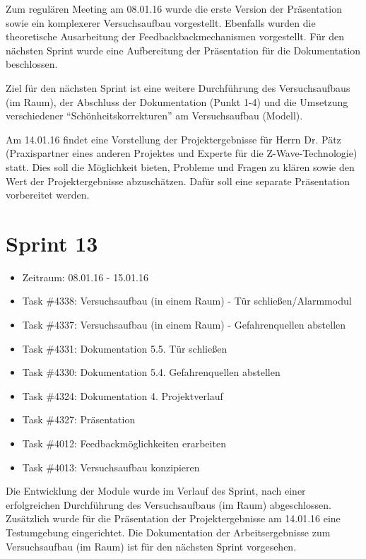 \documentclass[12pt, oneside, smallheadings]{scrbook}
\begin{document}
Zum regulären Meeting am 08.01.16 wurde die erste Version der Präsentation sowie ein komplexerer Versuchsaufbau vorgestellt. Ebenfalls wurden die theoretische Ausarbeitung der Feedbackbackmechanismen vorgestellt. Für den nächsten Sprint wurde eine Aufbereitung der Präsentation für die Dokumentation beschlossen.

Ziel für den nächsten Sprint ist eine weitere Durchführung des Versuchsaufbaus (im Raum), der Abschluss der Dokumentation (Punkt 1-4) und die Umsetzung verschiedener "`Schönheitskorrekturen"' am Versuchsaufbau (Modell). 

Am 14.01.16 findet eine Vorstellung der Projektergebnisse für Herrn Dr. Pätz (Praxispartner eines anderen Projektes und Experte für die Z-Wave-Technologie) statt. Dies soll die Möglichkeit bieten, Probleme und Fragen zu klären sowie den Wert der Projektergebnisse abzuschätzen. Dafür soll eine separate Präsentation vorbereitet werden.

\section{Sprint 13}
\begin{itemize}
	\item Zeitraum: 08.01.16 - 15.01.16 \newline
	\item Task \#4338: Versuchsaufbau (in einem Raum) - Tür schließen/Alarmmodul
	\item Task \#4337: Versuchsaufbau (in einem Raum) - Gefahrenquellen abstellen
	\item Task \#4331: Dokumentation 5.5. Tür schließen
	\item Task \#4330: Dokumentation 5.4. Gefahrenquellen abstellen
	\item Task \#4324: Dokumentation 4. Projektverlauf
	\item Task \#4327: Präsentation
	\item Task \#4012: Feedbackmöglichkeiten erarbeiten
	\item Task \#4013: Versuchsaufbau konzipieren\\
\end{itemize}
\noindent
Die Entwicklung der Module wurde im Verlauf des Sprint, nach einer erfolgreichen Durchführung des Versuchsaufbaus (im Raum) abgeschlossen. Zusätzlich wurde für die Präsentation der Projektergebnisse am 14.01.16 eine Testumgebung eingerichtet. Die Dokumentation der Arbeitsergebnisse zum Versuchsaufbau (im Raum) ist für den nächsten Sprint vorgesehen.
\end{document}
